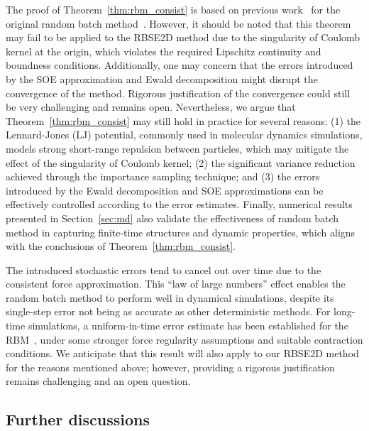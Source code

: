The proof of Theorem~\ref{thm:rbm_consist} is based on previous work~\cite{jin2021convergence,Ye2023IMA} for the original random batch method~\cite{jin2020random}. However, it should be noted that this theorem may fail to be applied to the RBSE2D method due to the singularity of Coulomb kernel at the origin, which violates the required Lipschitz continuity and boundness conditions. 
Additionally, one may concern that the errors introduced by the SOE approximation and Ewald decomposition might disrupt the convergence of the method. 
Rigorous justification of the convergence could still be very challenging and remains open.
Nevertheless, we argue that Theorem~\ref{thm:rbm_consist} may still hold in practice for several reasons: (1) the Lennard-Jones (LJ) potential, commonly used in molecular dynamics simulations, models strong short-range repulsion between particles, which may mitigate the effect of the singularity of Coulomb kernel; (2) the significant variance reduction achieved through the importance sampling technique; and (3) the errors introduced by the Ewald decomposition and SOE approximations can be effectively controlled according to the error estimates. 
Finally, numerical results presented in Section~\ref{sec:md} also validate the effectiveness of random batch method in capturing finite-time structures and dynamic properties, which aligns with the conclusions of Theorem~\ref{thm:rbm_consist}.


The introduced stochastic errors tend to cancel out over time due to the consistent force approximation. This ``law of large numbers'' effect enables the random batch method to perform well in dynamical simulations, despite its single-step error not being as accurate as other deterministic methods. 
For long-time simulations, a uniform-in-time error estimate has been established for the RBM~\cite{Jin2022MMS}, under some stronger force regularity assumptions and suitable contraction conditions. 
We anticipate that this result will also apply to our RBSE2D method for the reasons mentioned above; however, providing a rigorous justification remains challenging and an open question.

\subsection{Further discussions} \label{subsec::conv}

